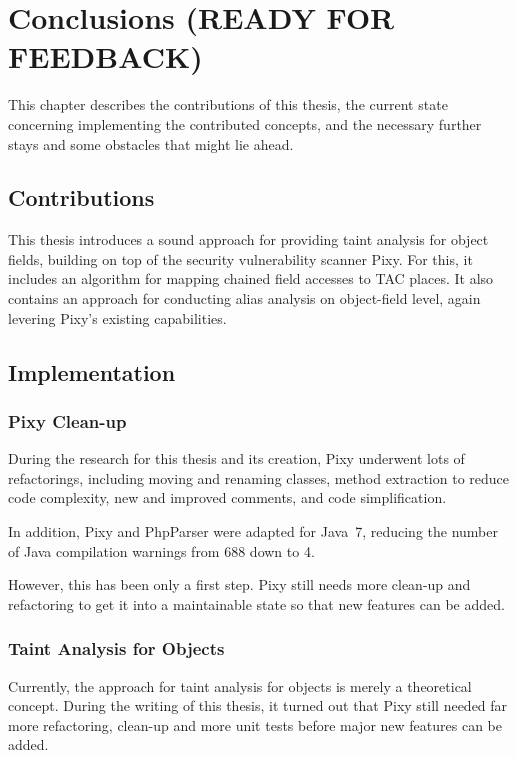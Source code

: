 \chapter{Conclusions (READY FOR FEEDBACK)}
\label{conclusions}

This chapter describes the contributions of this thesis, the current state concerning implementing the contributed concepts, and the necessary further stays and some obstacles that might lie ahead.

\section{Contributions}

This thesis introduces a sound approach for providing taint analysis for object fields, building on top of the security vulnerability scanner Pixy. For this, it includes an algorithm for mapping chained field accesses to TAC places. It also contains an approach for conducting alias analysis on object-field level, again levering Pixy's existing capabilities.


\section{Implementation}

\subsection{Pixy Clean-up}

During the research for this thesis and its creation, Pixy underwent lots of refactorings, including moving and renaming classes, method extraction to reduce code complexity, new and improved comments, and code simplification.

In addition, Pixy and PhpParser were adapted for Java~7, reducing the number of Java compilation warnings from 688 down to 4.

However, this has been only a first step. Pixy still needs more clean-up and refactoring to get it into a maintainable state so that new features can be added.


\subsection{Taint Analysis for Objects}

Currently, the approach for taint analysis for objects is merely a theoretical concept. During the writing of this thesis, it turned out that Pixy still needed far more refactoring, clean-up and more unit tests before major new features can be added.


